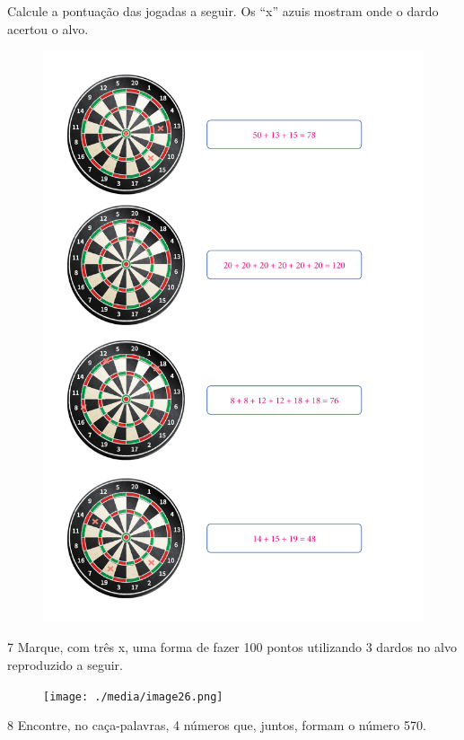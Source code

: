 Calcule a pontuação das jogadas a seguir. Os ``x'' azuis mostram onde o dardo acertou o alvo.


\begin{figure}[htpb!]
\includegraphics[width=.7\textwidth]{./media/image25_prof.png}
\end{figure}

\pagebreak

\num{7} Marque, com três x, uma forma de fazer 100 pontos utilizando 3 dardos no alvo reproduzido a seguir.

\begin{figure}[htpb!]
\centering
\texttt{[image: ./media/image26.png]}
\end{figure}

\vspace*{-1em}


\vspace*{0.5em}

\num{8} Encontre, no caça-palavras, 4 números que, juntos, formam o número 570.


